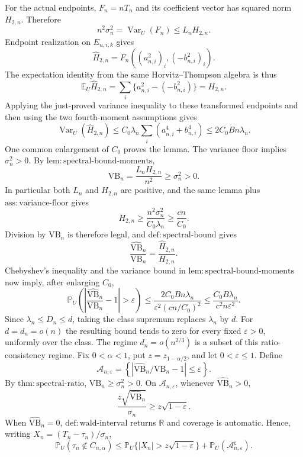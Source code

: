 For the actual endpoints, \(F_n=nT_n\) and its coefficient vector has squared norm \(H_{2,n}\).  Therefore
\[
 n^2\sigma_n^2=\operatorname{Var}_U(F_n)
 \le L_nH_{2,n}.
\]
Endpoint realization on \(E_{n,i,k}\) gives
\[
 \widehat H_{2,n}=F_n((a_{n,i}^2)_i,(-b_{n,i}^2)_i).
\]
The expectation identity from the same Horvitz--Thompson algebra is thus
\[
 \mathbb E_U\widehat H_{2,n}=\sum_i\{a_{n,i}^2-(-b_{n,i}^2)\}=H_{2,n}.
\]
Applying the just-proved variance inequality to these transformed endpoints and then using the two fourth-moment assumptions gives
\[
 \operatorname{Var}_U(\widehat H_{2,n})
 \le C_0\lambda_n\sum_i(a_{n,i}^4+b_{n,i}^4)
 \le2C_0Bn\lambda_n.
\]
One common enlargement of \(C_0\) proves the lemma.
The variance floor implies \(\sigma_n^2>0\).  By \(\mathrm{lem:spectral\text{-}bound\text{-}moments}\),
\[
 \mathrm{VB}_n=\frac{L_nH_{2,n}}{n^2}\ge\sigma_n^2>0.
\]
In particular both \(L_n\) and \(H_{2,n}\) are positive, and the same lemma plus \(\mathrm{ass:variance\text{-}floor}\) gives
\[
 H_{2,n}\ge\frac{n^2\sigma_n^2}{C_0\lambda_n}\ge\frac{cn}{C_0}.
\]
Division by \(\mathrm{VB}_n\) is therefore legal, and \(\mathrm{def:spectral\text{-}bound}\) gives
\[
 \frac{\widehat{\mathrm{VB}}_n}{\mathrm{VB}_n}
 =\frac{\widehat H_{2,n}}{H_{2,n}}.
\]
Chebyshev's inequality and the variance bound in \(\mathrm{lem:spectral\text{-}bound\text{-}moments}\) now imply, after enlarging \(C_0\),
\[
 \mathbb P_U\left(\left|\frac{\widehat{\mathrm{VB}}_n}{\mathrm{VB}_n}-1\right|>\varepsilon\right)
 \le\frac{2C_0Bn\lambda_n}{\varepsilon^2(cn/C_0)^2}
 \le\frac{C_0B\lambda_n}{c^2n\varepsilon^2}.
\]
Since \(\lambda_n\le D_n\le d\), taking the class supremum replaces \(\lambda_n\) by \(d\).  For \(d=d_n=o(n)\) the resulting bound tends to zero for every fixed \(\varepsilon>0\), uniformly over the class.  The regime \(d_n=o(n^{2/3})\) is a subset of this ratio-consistency regime.
Fix \(0<\alpha<1\), put \(z=z_{1-\alpha/2}\), and let \(0<\varepsilon\le1\).  Define
\[
 \mathcal A_{n,\varepsilon}=
 \left\{\left|\widehat{\mathrm{VB}}_n/\mathrm{VB}_n-1\right|\le\varepsilon\right\}.
\]
By \(\mathrm{thm:spectral\text{-}ratio}\), \(\mathrm{VB}_n\ge\sigma_n^2>0\).  On \(\mathcal A_{n,\varepsilon}\), whenever \(\widehat{\mathrm{VB}}_n>0\),
\[
 \frac{z\sqrt{\widehat{\mathrm{VB}}_n}}{\sigma_n}
 \ge z\sqrt{1-\varepsilon}.
\]
When \(\widehat{\mathrm{VB}}_n=0\), \(\mathrm{def:wald\text{-}interval}\) returns \(\mathbb R\) and coverage is automatic.  Hence, writing \(X_n=(T_n-\tau_n)/\sigma_n\),
\[
 \mathbb P_U(\tau_n\notin C_{n,\alpha})
 \le\mathbb P_U\{|X_n|>z\sqrt{1-\varepsilon}\}
 +\mathbb P_U(\mathcal A_{n,\varepsilon}^{\mathsf c}).
\]
